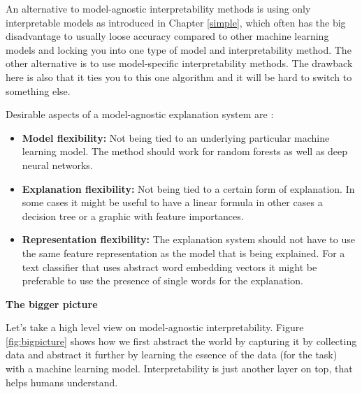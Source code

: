 \documentclass[12pt,]{krantz}
\providecommand{\tightlist}{%
  \setlength{\itemsep}{0pt}\setlength{\parskip}{0pt}}
\theoremstyle{definition}
\theoremstyle{definition}
\theoremstyle{definition}
\theoremstyle{remark}
\begin{document}
An alternative to model-agnostic interpretability methods is using only
interpretable models as introduced in Chapter \ref{simple}, which often
has the big disadvantage to usually loose accuracy compared to other
machine learning models and locking you into one type of model and
interpretability method. The other alternative is to use model-specific
interpretability methods. The drawback here is also that it ties you to
this one algorithm and it will be hard to switch to something else.

Desirable aspects of a model-agnostic explanation system are
\citep{Ribeiro2016b}:

\begin{itemize}
\tightlist
\item
  \textbf{Model flexibility:} Not being tied to an underlying particular
  machine learning model. The method should work for random forests as
  well as deep neural networks.
\item
  \textbf{Explanation flexibility:} Not being tied to a certain form of
  explanation. In some cases it might be useful to have a linear formula
  in other cases a decision tree or a graphic with feature importances.
\item
  \textbf{Representation flexibility:} The explanation system should not
  have to use the same feature representation as the model that is being
  explained. For a text classifier that uses abstract word embedding
  vectors it might be preferable to use the presence of single words for
  the explanation.
\end{itemize}

\textbf{The bigger picture}

Let's take a high level view on model-agnostic interpretability. Figure
\ref{fig:bigpicture} shows how we first abstract the world by capturing
it by collecting data and abstract it further by learning the essence of
the data (for the task) with a machine learning model. Interpretability
is just another layer on top, that helps humans understand.
\end{document}
